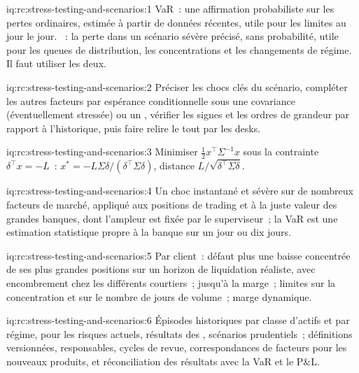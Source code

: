 \begin{solution}{iq:rc:stress-testing-and-scenarios:1}
VaR~: une affirmation probabiliste sur les pertes ordinaires, estimée à partir de données récentes, utile pour les limites
au jour le jour. ~: la perte dans un scénario sévère précisé, sans probabilité, utile pour les queues
de distribution, les concentrations et les changements de régime. Il faut utiliser les deux.
\end{solution}

\begin{solution}{iq:rc:stress-testing-and-scenarios:2}
Préciser les chocs clés du scénario, compléter les autres facteurs par espérance conditionnelle sous une
covariance (éventuellement stressée) ou un , vérifier les signes et les ordres de grandeur par rapport à l'historique,
puis faire relire le tout par les desks.
\end{solution}

\begin{solution}{iq:rc:stress-testing-and-scenarios:3}
Minimiser $\tfrac12x^\top\Sigma^{-1}x$ sous la contrainte $\delta^\top x = -L$~: $x^* = -L\Sigma\delta/(\delta^\top\Sigma\delta)$, distance $L/\sqrt{\delta^\top\Sigma\delta}$.
\end{solution}

\begin{solution}{iq:rc:stress-testing-and-scenarios:4}
Un choc instantané et sévère sur de nombreux facteurs de marché, appliqué aux positions de trading et à la juste valeur
des grandes banques, dont l'ampleur est fixée par le superviseur~; la VaR est une estimation statistique propre à la banque sur
un jour ou dix jours.
\end{solution}

\begin{solution}{iq:rc:stress-testing-and-scenarios:5}
Par client~: défaut plus une baisse concentrée de ses plus grandes positions sur un horizon de liquidation réaliste,
avec encombrement chez les différents courtiers~;  jusqu'à la marge~; limites sur la concentration et
sur le nombre de jours de volume~; marge dynamique.
\end{solution}

\begin{solution}{iq:rc:stress-testing-and-scenarios:6}
Épisodes historiques par classe d'actifs et par régime,  pour les risques actuels, résultats des ,
scénarios prudentiels~; définitions versionnées, responsables, cycles de revue, correspondances de facteurs pour les nouveaux produits,
et réconciliation des résultats avec la VaR et le P\&L.
\end{solution}
